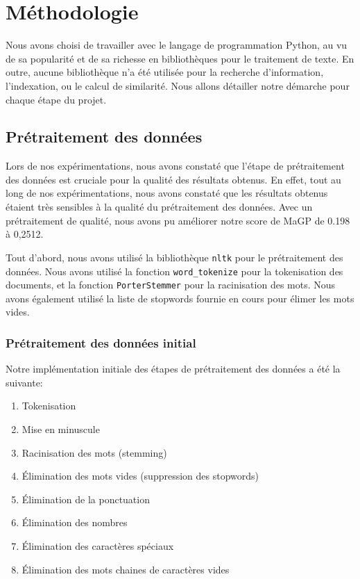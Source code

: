 \documentclass[a4paper, 12pt]{article}
\begin{document}
\section{Méthodologie}

Nous avons choisi de travailler avec le langage de programmation Python, au vu de sa popularité et de sa richesse en bibliothèques pour le traitement de texte. 
En outre, aucune bibliothèque n'a été utilisée pour la recherche d'information, l'indexation, ou le calcul de similarité. Nous allons détailler notre démarche pour chaque étape du projet.

\subsection{Prétraitement des données}

Lors de nos expérimentations, nous avons constaté que l'étape de prétraitement des données est cruciale pour la qualité des résultats obtenus.
En effet, tout au long de nos expérimentations, nous avons constaté que les résultats obtenus étaient très sensibles à la qualité du prétraitement des données. 
Avec un prétraitement de qualité, nous avons pu améliorer notre score de MaGP de 0.198 à 0,2512. 

Tout d'abord, nous avons utilisé la bibliothèque \texttt{nltk} pour le prétraitement des données.
Nous avons utilisé la fonction \texttt{word\_tokenize} pour la tokenisation des documents, et la fonction \texttt{PorterStemmer} pour la racinisation des mots.
Nous avons également utilisé la liste de stopwords fournie en cours pour élimer les mots vides.

\subsubsection{Prétraitement des données initial}

Notre implémentation initiale des étapes de prétraitement des données a été la suivante:

\begin{enumerate}
  \item Tokenisation
  \item Mise en minuscule
  \item Racinisation des mots (stemming)
  \item Élimination des mots vides (suppression des stopwords)
  \item Élimination de la ponctuation
  \item Élimination des nombres
  \item Élimination des caractères spéciaux
  \item Élimination des mots chaines de caractères vides  
\end{enumerate}
\end{document}
